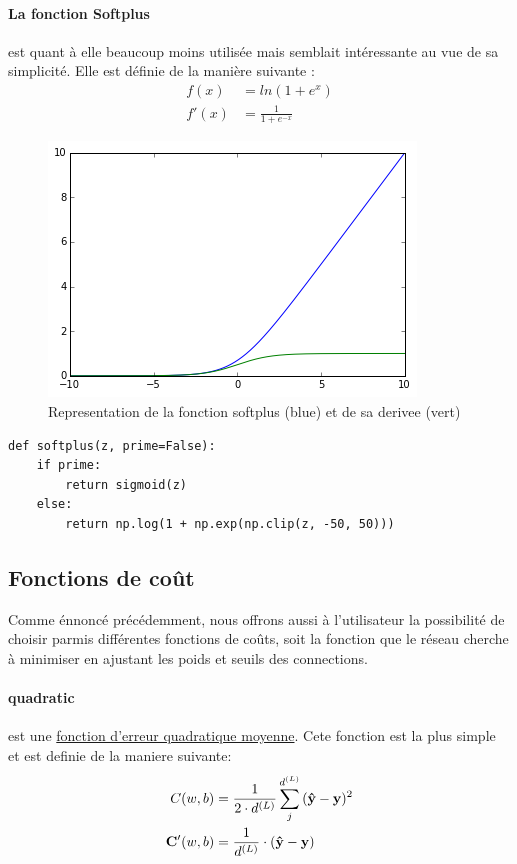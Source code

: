 \documentclass[11pt]{article}
\begin{document}
\paragraph{La fonction Softplus} est quant \`a elle beaucoup moins utilis\'ee mais
semblait int\'eressante au vue de sa simplicit\'e. Elle est d\'efinie de la mani\`ere
suivante :
\begin{equation}
	\begin{aligned}
		f(x)  &= ln(1+e^x) \\
		f'(x) &= \frac{1}{1+e^{-x}}
	\end{aligned}
\end{equation}
\begin{figure}[htp]
	\centering
	\includegraphics[scale=.5]{img/act_softplus.png}
	\caption{Representation de la fonction softplus (blue) et de sa derivee (vert)}
\end{figure}
\begin{lstlisting}
def softplus(z, prime=False):
	if prime:
		return sigmoid(z)
	else:
		return np.log(1 + np.exp(np.clip(z, -50, 50)))
\end{lstlisting}


\newpage
\subsection{Fonctions de co\^ut}\label{cost}
Comme \'ennonc\'e pr\'ec\'edemment, nous offrons aussi \`a l'utilisateur la
possibilit\'e de choisir parmis diff\'erentes fonctions de co\^uts, soit la fonction
que le r\'eseau cherche \`a minimiser en ajustant les poids et seuils des connections.
\paragraph{quadratic} est une
\href{https://fr.wikipedia.org/wiki/Erreur_quadratique_moyenne}
{fonction d'erreur quadratique moyenne}. Cete fonction est la plus simple et
est definie de la maniere suivante:
\begin{equation}
	\begin{aligned}
		C(w, b) &= \frac{1}{2\cdot d^{(L)}}\sum_{j}^{d^{(L)}}{({\bf\hat y} - {\bf y})^2}  \\
		{\bf C'}(w, b) &= \frac{1}{d^{(L)}}\cdot({\bf\hat y} - {\bf y})
	\end{aligned}
\end{equation}
\end{document}
